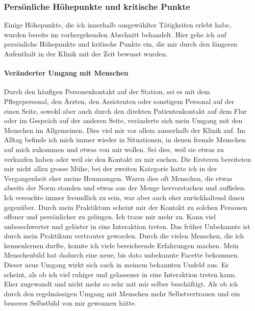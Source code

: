 \documentclass[jou,apacite]{apa6}
\begin{document}
\subsubsection{Persönliche Höhepunkte und kritische Punkte} \label{sec:Höhepunkte}
Einige Höhepunkte, die ich innerhalb ausgewählter Tätigkeiten erlebt habe, wurden bereits im vorhergehenden Abschnitt behandelt. Hier gehe ich auf persönliche Höhepunkte und kritische Punkte ein, die mir durch den längeren Aufenthalt in der Klinik mit der Zeit bewusst wurden. 

\paragraph{Veränderter Umgang mit Menschen}
Durch den häufigen Personenkontakt auf der Station, sei es mit dem Pflegepersonal, den Ärzten, den Assistenten oder sonstigem Personal auf der einen Seite, sowohl aber auch durch den direkten Patientenkontakt auf dem Flur oder im Gespräch auf der anderen Seite, veränderte sich mein Umgang mit den Menschen im Allgemeinen. Dies viel mir vor allem ausserhalb der Klinik auf. Im Alltag befinde ich mich immer wieder in Situationen, in denen fremde Menschen auf mich zukommen und etwas von mir wollen. Sei dies, weil sie etwas zu verkaufen haben oder weil sie den Kontakt zu mir suchen. Die Ersteren bereiteten mir nicht allzu grosse Mühe, bei der zweiten Kategorie hatte ich in der Vergangenheit eher meine Hemmungen. Waren dies oft Menschen, die etwas abseits der Norm standen und etwas aus der Menge hervorstachen und auffielen. Ich versuchte immer freundlich zu sein, war aber auch eher zurückhaltend ihnen gegenüber. Durch mein Praktiktum scheint mir der Kontakt zu solchen Personen offener und persönlicher zu gelingen. Ich traue mir mehr zu. Kann viel unbesschwerter und gelöster in eine Interaktion treten. Das früher Unbekannte ist durch mein Praktikum vertrauter geworden. Durch die vielen Menschen, die ich kennenlernen durfte, konnte ich viele bereichernde Erfahrungen machen. Mein Menschenbild hat dadurch eine neue, bis dato unbekannte Facette bekommen. Dieser neue Umgang wirkt sich auch in meinem bekannten Umfeld aus. Es scheint, als ob ich viel ruhiger und gelassener in eine Interaktion treten kann. Eher zugewandt und nicht mehr so sehr mit mir selber beschäftigt. Als ob ich durch den regelmässigen Umgang mit Menschen mehr Selbstvertrauen und ein besseres Selbstbild von mir gewonnen hätte. 
\end{document}
